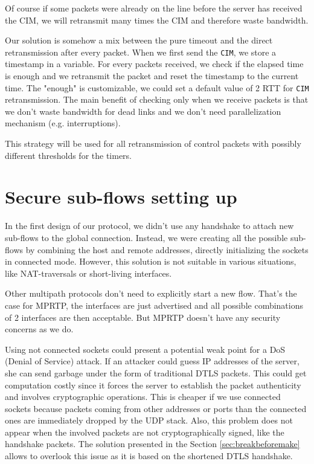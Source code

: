 Of course if some packets were already on the line before the server has received the CIM, we will retransmit many times the CIM and therefore waste bandwidth.

Our solution is somehow a mix between the pure timeout and the direct retransmission after every packet. When we first send the \texttt{CIM}, we store a timestamp in a variable. For every packets received, we check if the elapsed time is enough and we retransmit the packet and reset the timestamp to the current time. The "enough" is customizable, we could set a default value of 2 RTT for \texttt{CIM} retransmission. The main benefit of checking only when we receive packets is that we don't waste bandwidth for dead links and we don't need parallelization mechanism (e.g. interruptions).

This strategy will be used for all retransmission of control packets with possibly different thresholds for the timers.

\section{Secure sub-flows setting up}

In the first design of our protocol, we didn't use any handshake to attach new sub-flows to the global connection. Instead, we were creating all the possible sub-flows by combining the host and remote addresses, directly initializing the sockets in connected mode. However, this solution is not suitable in various situations, like NAT-traversals or short-living interfaces. 

Other multipath protocols don't need to explicitly start a new flow. That's the case for MPRTP, the interfaces are just advertised and all possible combinations of 2 interfaces are then acceptable. But MPRTP doesn't have any security concerns as we do.

Using not connected sockets could present a potential weak point for a DoS (Denial of Service) attack. If an attacker could guess IP addresses of the server, she can send garbage under the form of traditional DTLS packets. This could get computation costly since it forces the server to establish the packet authenticity and involves cryptographic operations. This is cheaper if we use connected sockets because packets coming from other addresses or ports than the connected ones are immediately dropped by the UDP stack. Also, this problem does not appear when the involved packets are not cryptographically signed, like the handshake packets. The solution presented in the Section \ref{sec:breakbeforemake} allows to overlook this issue as it is based on the shortened DTLS handshake.

